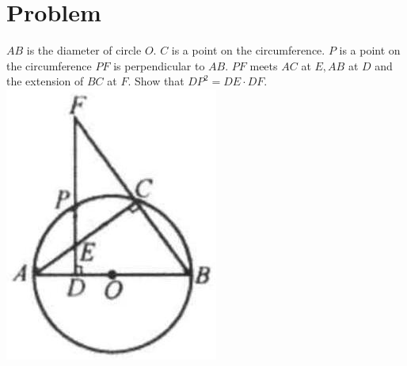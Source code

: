 \documentclass{article}
\begin{document}
\section*{Problem}
\(A B\) is the diameter of circle \(O\). \(C\) is a point on the circumference. \(P\) is a point on the circumference \(P F\) is perpendicular to \(A B\). \(P F\) meets \(A C\) at \(E, A B\) at \(D\) and the extension of \(B C\) at \(F\). Show that \(D P^{2}=D E \cdot D F\).\\
\centering
\includegraphics[width=\textwidth]{images/170(2).jpg}
\end{document}
